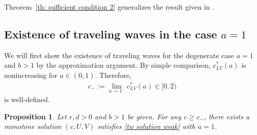 \documentclass[11pt,a4paper]{article}
\newtheorem{proposition}[theorem]{\textbf{Proposition}}
\numberwithin{equation}{section}
\numberwithin{figure}{section}
\newcommand\bea{\begin{eqnarray}}
\newcommand\eea{\end{eqnarray}}
\begin{document}
Theorem~\ref{th: sufficient condition 2} generalizes the result given in \cite{HuangHan2011}.





\subsection{Existence of traveling waves in the case $a=1$}
We will first show the existence of traveling waves for the degenerate case $a=1$ and $b> 1$ by the approximation argument. 
By simple comparison, $c^*_{LV}(a)$ is nonincreasing for $a\in(0,1)$.
Therefore,
\bea\label{c-}
c_-:=\lim_{a\to 1^-} c^*_{LV}(a)\in[0,2)
\eea
is well-defined. 
\begin{proposition}\label{prop:existence-tw}
    Let $r,d>0$ and $b>1$ be given.  For any 
        $c\geq c_-$, %
     there exists a monotone solution $(c,U,V)$ satisfies \eqref{tw solution weak} with $a=1$. %
\end{proposition}
\end{document}
